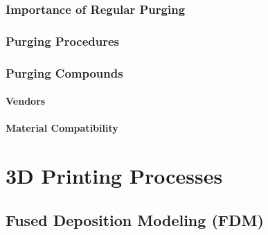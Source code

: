 \subsubsection{Importance of Regular Purging\label{sec:literatureReview:extrusion:purging:importance}}

\subsubsection{Purging Procedures\label{sec:literatureReview:extrusion:purging:procedures}}

\subsubsection{Purging Compounds\label{sec:literatureReview:extrusion:purging:compounds}}

\paragraph*{Vendors}

\paragraph*{Material Compatibility}

\section{3D Printing Processes\label{sec:literatureReview:printing}}

\subsection{Fused Deposition Modeling (FDM)\label{sec:literatureReview:printing:FDM}}

